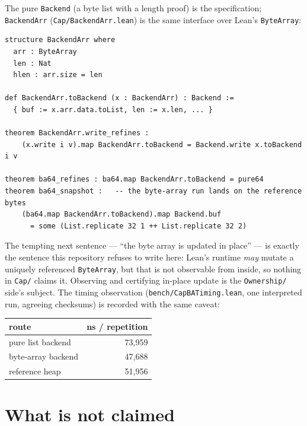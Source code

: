 \documentclass[10pt,a4paper]{article}
\newcommand{\file}[1]{\texttt{#1}}
\newcommand{\lean}[1]{\texttt{#1}}
\begin{document}
The pure \lean{Backend} (a byte list with a length proof) is the specification;
\lean{BackendArr} (\file{Cap/BackendArr.lean}) is the same interface over Lean's
\lean{ByteArray}:

\begin{lstlisting}
structure BackendArr where
  arr : ByteArray
  len : Nat
  hlen : arr.size = len

def BackendArr.toBackend (x : BackendArr) : Backend :=
  { buf := x.arr.data.toList, len := x.len, ... }

theorem BackendArr.write_refines :
    (x.write i v).map BackendArr.toBackend = Backend.write x.toBackend i v

theorem ba64_refines : ba64.map BackendArr.toBackend = pure64
theorem ba64_snapshot :   -- the byte-array run lands on the reference bytes
    (ba64.map BackendArr.toBackend).map Backend.buf
      = some (List.replicate 32 1 ++ List.replicate 32 2)
\end{lstlisting}

The tempting next sentence --- ``the byte array is updated in place'' --- is
exactly the sentence this repository refuses to write here: Lean's runtime
\emph{may} mutate a uniquely referenced \lean{ByteArray}, but that is not
observable from inside, so nothing in \file{Cap/} claims it. Observing and
certifying in-place update is the \file{Ownership/} side's subject. The timing
observation (\file{bench/CapBATiming.lean}, one interpreted run, agreeing
checksums) is recorded with the same caveat:

\begin{center}
\begin{tabular}{lr}
\toprule
route & ns / repetition \\
\midrule
pure list backend & 73{,}959 \\
byte-array backend & 47{,}688 \\
reference heap & 51{,}956 \\
\bottomrule
\end{tabular}
\end{center}

\section{What is not claimed}
\end{document}
